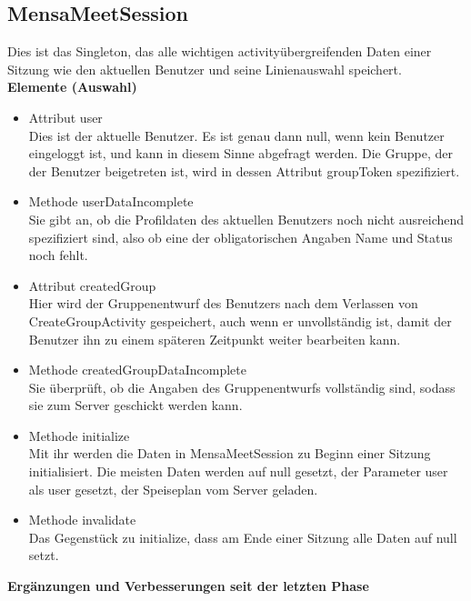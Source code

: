 \documentclass[a4paper]{scrreprt}
\begin{document}
\subsection{MensaMeetSession}
Dies ist das Singleton, das alle wichtigen activityübergreifenden Daten einer Sitzung wie den aktuellen Benutzer und seine Linienauswahl speichert. \\
\textbf{Elemente (Auswahl)}

\begin{itemize}
\item Attribut user \\
Dies ist der aktuelle Benutzer. Es ist genau dann null, wenn kein Benutzer eingeloggt ist, und kann in diesem Sinne abgefragt werden. Die Gruppe, der der Benutzer beigetreten ist, wird in dessen Attribut groupToken spezifiziert.
\item Methode userDataIncomplete \\
Sie gibt an, ob die Profildaten des aktuellen Benutzers noch nicht ausreichend spezifiziert sind, also ob eine der obligatorischen Angaben Name und Status noch fehlt.
\item Attribut createdGroup \\
Hier wird der Gruppenentwurf des Benutzers nach dem Verlassen von CreateGroupActivity gespeichert, auch wenn er unvollständig ist, damit der Benutzer ihn zu einem späteren Zeitpunkt weiter bearbeiten kann.
\item Methode createdGroupDataIncomplete \\
Sie überprüft, ob die Angaben des Gruppenentwurfs vollständig sind, sodass sie zum Server geschickt werden kann.
\item Methode initialize \\
Mit ihr werden die Daten in MensaMeetSession zu Beginn einer Sitzung initialisiert. Die meisten Daten werden auf null gesetzt, der Parameter user als user gesetzt, der Speiseplan vom Server geladen.
\item Methode invalidate \\
Das Gegenstück zu initialize, dass am Ende einer Sitzung alle Daten auf null setzt.
\end{itemize}

\textbf{Ergänzungen und Verbesserungen seit der letzten Phase}
\end{document}
